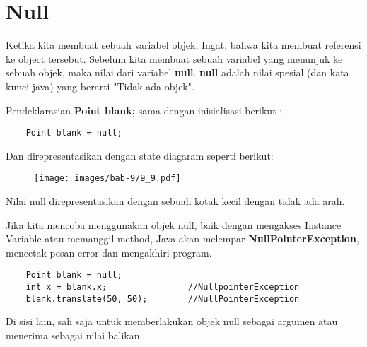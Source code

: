 \section{Null}
Ketika kita membuat sebuah variabel objek, Ingat, bahwa kita membuat referensi ke object tersebut. Sebelum kita membuat sebuah variabel yang menunjuk ke sebuah objek, maka nilai dari variabel \textbf{null}. \textbf{null} adalah nilai spesial (dan kata kunci java) yang berarti "Tidak ada objek".

Pendeklarasian \textbf{Point blank;} sama dengan inisialisasi berikut : \\
\begin{lstlisting}
	Point blank = null;
\end{lstlisting}
Dan direpresentasikan dengan state diagaram seperti berikut:\\
\begin{figure}[H]
	\centering \texttt{[image: images/bab-9/9\_9.pdf]}
\end{figure}
Nilai null direpresentasikan dengan sebuah kotak kecil dengan tidak ada arah.

Jika kita mencoba menggunakan objek null, baik dengan mengakses Instance Variable atau memanggil method, Java akan melempar \textbf{NullPointerException}, mencetak pesan error dan mengakhiri program.

\begin{lstlisting}
	Point blank = null;
	int x = blank.x;				//NullpointerException
	blank.translate(50, 50);		//NullPointerException	
\end{lstlisting}
Di sisi lain, sah saja untuk memberlakukan objek null sebagai argumen atau menerima sebagai nilai balikan.

